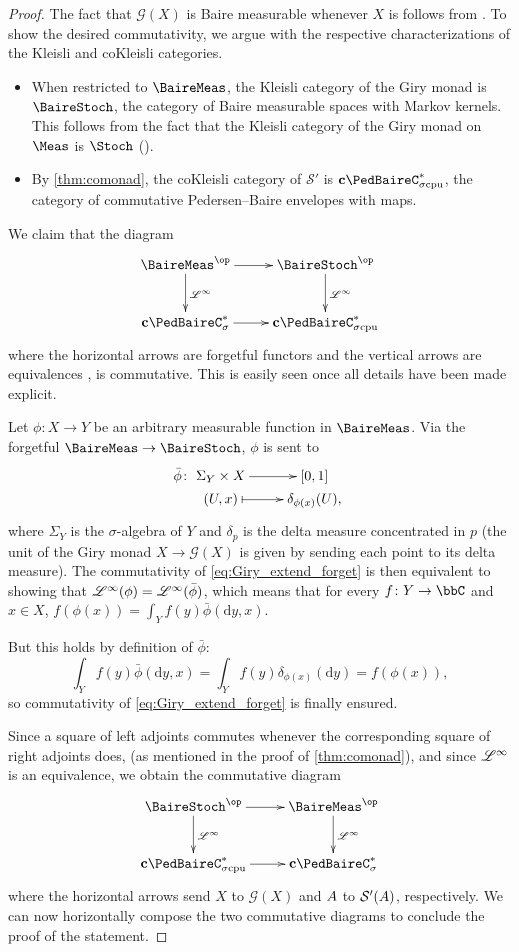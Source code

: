 \begin{proof}
	The fact that $\mathcal{G}(X)$ is Baire measurable whenever $X$ is follows from \cite[Corollary A.4]{shirazi2026commutativity}.
	To show the desired commutativity, we argue with the respective characterizations of the Kleisli and coKleisli categories.
	\begin{itemize}
		\item When restricted to $\BaireMeas$, the Kleisli category of the Giry monad is $\BaireStoch$, the category of Baire measurable spaces with Markov kernels. This follows from the fact that the Kleisli category of the Giry monad on $\Meas$ is $\Stoch$ (\cite[Section I.4]{giry82probability}).
		\item By \cref{thm:comonad}, the coKleisli category of $\mathcal{S}'$ is $\cpbenvcpu$, the category of commutative Pedersen--Baire envelopes with \scpu{} maps.
	\end{itemize}
	We claim that the diagram
	\begin{equation}\label{eq:Giry_extend_forget}
		\vxy{
			\BaireMeas^{\op}\ar[r]\ar[d]^{\Linf} & \BaireStoch^{\op} \ar[d]^{\Linf}\\
			\cPBenv \ar[r] & \cpbenvcpu}
	\end{equation}
	where the horizontal arrows are forgetful functors and the vertical arrows are equivalences \cite[Corollaries 4.2.9 and 4.3.8]{fritz2025categories}, is commutative.
	This is easily seen once all details have been made explicit.

	Let $\phi\colon X\to Y$ be an arbitrary measurable function in $\BaireMeas$. Via the forgetful $\BaireMeas\to \BaireStoch$, $\phi$ is sent to
	\[
		\bar{\phi} \colon \xymatrix@R=.1pt{
		\Sigma_Y\times X \ar[r]
		& [0,1] \\
		(U,x)
		\ar@{|->}[r]
		& \delta_{\phi(x)}(U),}
	\]
	where $\Sigma_Y$ is the $\sigma$-algebra of $Y$ and $\delta_{p}$ is the delta measure concentrated in $p$ (the unit of the Giry monad $X\to \mathcal{G}(X)$ is given by sending each point to its delta measure).
	The commutativity of \eqref{eq:Giry_extend_forget} is then equivalent to showing that $\mathscr{L}^{\infty}(\phi)= \mathscr{L}^{\infty}(\bar{\phi})$,
	which means that for every $f\colon Y\to \bbC$ and $x \in X$, $f(\phi(x))=\int_Y f(y) \bar{\phi}(\mathrm{d}y,x)$.

	But this holds by definition of $\bar{\phi}$:
	\[
		\int_Y f(y) \bar{\phi}(\mathrm{d}y,x)=\int_Y f(y) \delta_{\phi(x)}(\mathrm{d}y) =f(\phi(x)),
	\]
	so commutativity of \eqref{eq:Giry_extend_forget} is finally ensured.

	Since a square of left adjoints commutes whenever the corresponding square of right adjoints does, (as mentioned in the proof of \cref{thm:comonad}), and since $\mathscr{L}^{\infty}$ is an equivalence, we obtain the commutative diagram
	\[
		\vxy{
			\BaireStoch^{\op} \ar[r]\ar[d]^{\Linf} & \BaireMeas^{\op} \ar[d]^{\Linf}\\
			\cpbenvcpu \ar[r] & \cPBenv}
	\]
	where the horizontal arrows send $X$ to $\mathcal{G}(X)$ and ${A}$ to $\mathcal{S}'({A})$, respectively.
	We can now horizontally compose the two commutative diagrams to conclude the proof of the statement.
\end{proof}

